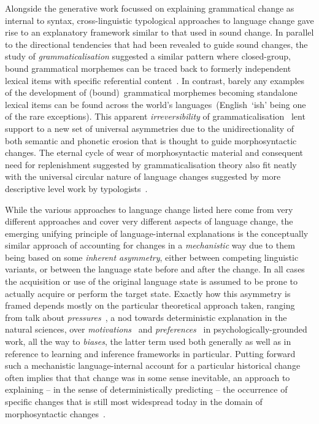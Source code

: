 Alongside the generative work focussed on explaining grammatical change as internal to syntax, cross-linguistic typological approaches to language change gave rise to an explanatory framework similar to that used in sound change. In parallel to the directional tendencies that had been revealed to guide sound changes, the study of \emph{grammaticalisation} suggested a similar pattern where closed-group, bound grammatical morphemes can be traced back to formerly independent lexical items with specific referential content~\citep{Hopper1993}.
In contrast, barely any examples of the development of (bound)~grammatical morphemes becoming standalone lexical items can be found across the world's languages~(English~`ish' being one of the rare exceptions).
This apparent \emph{irreversibility} of grammaticalisation~\citep{Haspelmath2004directionality} lent support to a new set of universal asymmetries due to the unidirectionality of both semantic and phonetic erosion that is thought to guide morphosyntactic changes. The eternal cycle of wear of morphosyntactic material and consequent need for replenishment suggested by grammaticalisation theory also fit neatly with the universal circular nature of language changes suggested by more descriptive level work by typologists~\citep{Cowgill1963,Hodge1970}.

While the various approaches to language change listed here come from very different approaches and cover very different aspects of language change, 
the emerging unifying principle of language-internal explanations is the conceptually similar approach of accounting for changes in a \emph{mechanistic} way due to them being based on some \emph{inherent asymmetry}, either between competing linguistic variants, or between the language state before and after the change. In all cases the acquisition or use of the original language state is assumed to be prone to actually acquire or perform the target state. Exactly how this asymmetry is framed depends mostly on the particular theoretical approach taken, ranging from talk about \emph{pressures}~\citep[e.g.][]{Thomsen2006}, a nod towards deterministic explanation in the natural sciences, over \emph{motivations}~\citep{MacWhinney2014} and \emph{preferences}~\citep{Fedzechkina2016} in psychologically-grounded work, all the way to \emph{biases}, the latter term used both generally as well as in reference to learning and inference frameworks in particular.
Putting forward such a mechanistic language-internal account for a particular historical change often implies that that change was in some sense inevitable, an approach to explaining -- in the sense of deterministically predicting -- the occurrence of specific changes that is still most widespread today in the domain of morphosyntactic changes~\citep{Lightfoot2010}.


